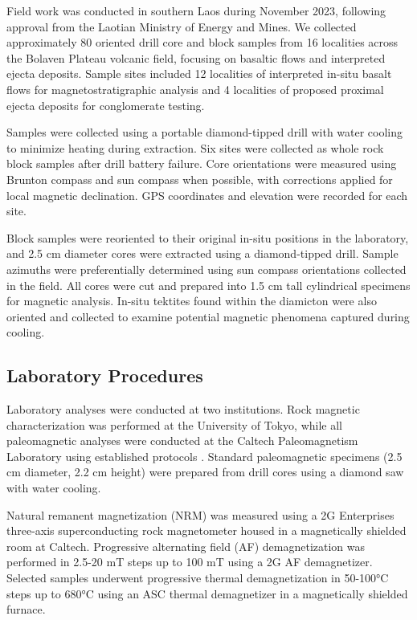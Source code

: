 \documentclass[twocolumn,11pt]{article}
\begin{document}
Field work was conducted in southern Laos during November 2023, following approval from the Laotian Ministry of Energy and Mines. We collected approximately 80 oriented drill core and block samples from 16 localities across the Bolaven Plateau volcanic field, focusing on basaltic flows and interpreted ejecta deposits. Sample sites included 12 localities of interpreted in-situ basalt flows for magnetostratigraphic analysis and 4 localities of proposed proximal ejecta deposits for conglomerate testing.

Samples were collected using a portable diamond-tipped drill with water cooling to minimize heating during extraction. Six sites were collected as whole rock block samples after drill battery failure. Core orientations were measured using Brunton compass and sun compass when possible, with corrections applied for local magnetic declination. GPS coordinates and elevation were recorded for each site.

Block samples were reoriented to their original in-situ positions in the laboratory, and 2.5 cm diameter cores were extracted using a diamond-tipped drill. Sample azimuths were preferentially determined using sun compass orientations collected in the field. All cores were cut and prepared into 1.5 cm tall cylindrical specimens for magnetic analysis. In-situ tektites found within the diamicton were also oriented and collected to examine potential magnetic phenomena captured during cooling.

\subsection{Laboratory Procedures}

Laboratory analyses were conducted at two institutions. Rock magnetic characterization was performed at the University of Tokyo, while all paleomagnetic analyses were conducted at the Caltech Paleomagnetism Laboratory using established protocols \citep{Biasi2021}. Standard paleomagnetic specimens (2.5 cm diameter, 2.2 cm height) were prepared from drill cores using a diamond saw with water cooling.

Natural remanent magnetization (NRM) was measured using a 2G Enterprises three-axis superconducting rock magnetometer housed in a magnetically shielded room at Caltech. Progressive alternating field (AF) demagnetization was performed in 2.5-20 mT steps up to 100 mT using a 2G AF demagnetizer. Selected samples underwent progressive thermal demagnetization in 50-100°C steps up to 680°C using an ASC thermal demagnetizer in a magnetically shielded furnace.
\end{document}

